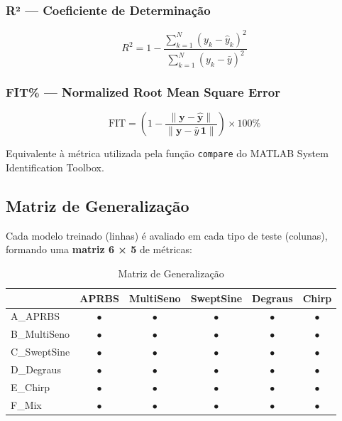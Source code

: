 \documentclass[11pt,a4paper]{article}
\begin{document}
\subsubsection*{R² — Coeficiente de Determinação}
\begin{equation}
R^2 = 1 - \frac{\sum_{k=1}^{N} (y_k - \hat{y}_k)^2}{\sum_{k=1}^{N} (y_k - \bar{y})^2}
\end{equation}

\subsubsection*{FIT\% — Normalized Root Mean Square Error}
\begin{equation}
\text{FIT} = \left(1 - \frac{\| \mathbf{y} - \hat{\mathbf{y}} \|}{\| \mathbf{y} - \bar{y}\,\mathbf{1} \|}\right) \times 100\%
\end{equation}

Equivalente à métrica utilizada pela função \texttt{compare} do MATLAB System Identification Toolbox.

\subsection{Matriz de Generalização}

Cada modelo treinado (linhas) é avaliado em cada tipo de teste (colunas), formando uma \textbf{matriz 6 × 5} de métricas:

\begin{table}[hbt!]
\centering
\caption{Matriz de Generalização}
\vspace{0.2cm}
\begin{tabular}{lccccc}
\toprule
 & \textbf{APRBS} & \textbf{MultiSeno} & \textbf{SweptSine} & \textbf{Degraus} & \textbf{Chirp} \\
\midrule
A\_APRBS & $\bullet$ & $\bullet$ & $\bullet$ & $\bullet$ & $\bullet$ \\
B\_MultiSeno & $\bullet$ & $\bullet$ & $\bullet$ & $\bullet$ & $\bullet$ \\
C\_SweptSine & $\bullet$ & $\bullet$ & $\bullet$ & $\bullet$ & $\bullet$ \\
D\_Degraus & $\bullet$ & $\bullet$ & $\bullet$ & $\bullet$ & $\bullet$ \\
E\_Chirp & $\bullet$ & $\bullet$ & $\bullet$ & $\bullet$ & $\bullet$ \\
F\_Mix & $\bullet$ & $\bullet$ & $\bullet$ & $\bullet$ & $\bullet$ \\
\bottomrule
\end{tabular}
\end{table}
\end{document}
